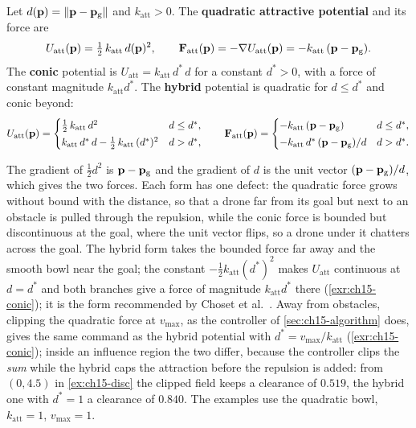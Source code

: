 \begin{definition}
\label{def:ch15-attractive}
Let $d(\mathbf{p}) = \left\lVert \mathbf{p} - \mathbf{p}_{\mathrm{g}} \right\rVert$ and $k_{\mathrm{att}} > 0$. The
\textbf{quadratic attractive potential} and its force are
\begin{equation}
  U_{\mathrm{att}}(\mathbf{p}) = \tfrac12\, k_{\mathrm{att}}\, d(\mathbf{p})^2,
  \qquad
  \mathbf{F}_{\mathrm{att}}(\mathbf{p}) = -\nabla U_{\mathrm{att}}(\mathbf{p})
  = -k_{\mathrm{att}}\,(\mathbf{p} - \mathbf{p}_{\mathrm{g}}).
  \label{eq:ch15-uatt}
\end{equation}
The \textbf{conic} potential is $U_{\mathrm{att}} = k_{\mathrm{att}}\, d^*\, d$
for a constant $d^* > 0$, with a force of constant magnitude
$k_{\mathrm{att}} d^*$. The \textbf{hybrid} potential is quadratic for $d
\le d^*$ and conic beyond:
\begin{equation}
  U_{\mathrm{att}}(\mathbf{p}) =
  \begin{cases}
    \tfrac12\, k_{\mathrm{att}}\, d^2 & d \le d^*,\\[2pt]
    k_{\mathrm{att}}\, d^*\, d - \tfrac12\, k_{\mathrm{att}}\, (d^*)^2 & d > d^*,
  \end{cases}
  \qquad
  \mathbf{F}_{\mathrm{att}}(\mathbf{p}) =
  \begin{cases}
    -k_{\mathrm{att}}\, (\mathbf{p} - \mathbf{p}_{\mathrm{g}}) & d \le d^*,\\[2pt]
    -k_{\mathrm{att}}\, d^*\, (\mathbf{p} - \mathbf{p}_{\mathrm{g}})/d & d > d^*.
  \end{cases}
  \label{eq:ch15-hybrid}
\end{equation}
\end{definition}

The gradient of $\tfrac12 d^2$ is $\mathbf{p} - \mathbf{p}_{\mathrm{g}}$ and the gradient
of $d$ is the unit vector $(\mathbf{p} - \mathbf{p}_{\mathrm{g}})/d$, which gives the two
forces. Each form has one defect: the quadratic force grows without bound
with the distance, so that a drone far from its goal but next to an obstacle
is pulled through the repulsion, while the conic force is bounded but
discontinuous at the goal, where the unit vector flips, so a drone under it
chatters across the goal. The hybrid form takes the bounded force far away
and the smooth bowl near the goal; the constant $-\tfrac12 k_{\mathrm{att}}
(d^*)^2$ makes $U_{\mathrm{att}}$ continuous at $d = d^*$ and both branches
give a force of magnitude $k_{\mathrm{att}} d^*$ there (\cref{exr:ch15-conic});
it is the form recommended by Choset et al.~\cite{choset2005principles}.
Away from obstacles, clipping the quadratic force at $v_{\max}$, as the
controller of \cref{sec:ch15-algorithm} does, gives the same command as the
hybrid potential with $d^* = v_{\max}/k_{\mathrm{att}}$
(\cref{exr:ch15-conic}); inside an influence region the two differ, because the
controller clips the \emph{sum} while the hybrid caps the attraction before the
repulsion is added: from $(0, 4.5)$ in \cref{ex:ch15-disc} the clipped field
keeps a clearance of $0.519$, the hybrid one with $d^* = 1$ a clearance of
$0.840$. The examples use the quadratic bowl, $k_{\mathrm{att}} = 1$,
$v_{\max} = 1$.

